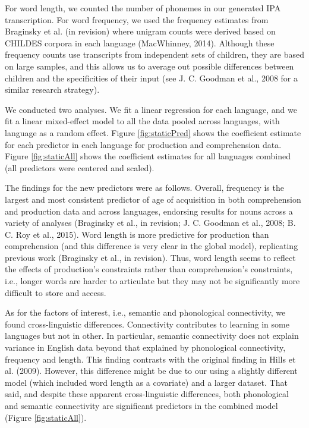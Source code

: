 \documentclass[english,floatsintext,man]{apa6}
\theoremstyle{definition}
\theoremstyle{definition}
\theoremstyle{definition}
\theoremstyle{remark}
\begin{document}
For word length, we counted the number of phonemes in our generated IPA
transcription. For word frequency, we used the frequency estimates from
Braginsky et al. (in revision) where unigram counts were derived based
on CHILDES corpora in each language (MacWhinney, 2014). Although these
frequency counts use transcripts from independent sets of children, they
are based on large samples, and this allows us to average out possible
differences between children and the specificities of their input (see
J. C. Goodman et al., 2008 for a similar research strategy).

We conducted two analyses. We fit a linear regression for each language,
and we fit a linear mixed-effect model to all the data pooled across
languages, with language as a random effect. Figure \ref{fig:staticPred}
shows the coefficient estimate for each predictor in each language for
production and comprehension data. Figure \ref{fig:staticAll} shows the
coefficient estimates for all languages combined (all predictors were
centered and scaled).

The findings for the new predictors were as follows. Overall, frequency
is the largest and most consistent predictor of age of acquisition in
both comprehension and production data and across languages, endorsing
results for nouns across a variety of analyses (Braginsky et al., in
revision; J. C. Goodman et al., 2008; B. C. Roy et al., 2015). Word
length is more predictive for production than comprehension (and this
difference is very clear in the global model), replicating previous work
(Braginsky et al., in revision). Thus, word length seems to reflect the
effects of production's constraints rather than comprehension's
constraints, i.e., longer words are harder to articulate but they may
not be significantly more difficult to store and access.

As for the factors of interest, i.e., semantic and phonological
connectivity, we found cross-linguistic differences. Connectivity
contributes to learning in some languages but not in other. In
particular, semantic connectivity does not explain variance in English
data beyond that explained by phonological connectivity, frequency and
length. This finding contrasts with the original finding in Hills et al.
(2009). However, this difference might be due to our using a slightly
different model (which included word length as a covariate) and a larger
dataset. That said, and despite these apparent cross-linguistic
differences, both phonological and semantic connectivity are significant
predictors in the combined model (Figure \ref{fig:staticAll}).
\end{document}
